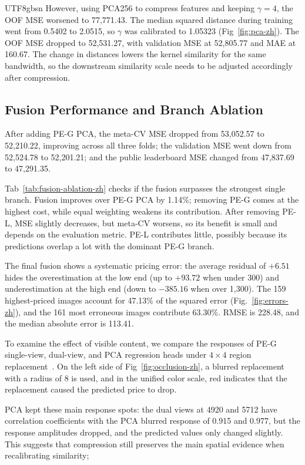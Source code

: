 \documentclass[conference,a4paper]{IEEEtran}
\begin{document}
\begin{CJK*}{UTF8}{gbsn}
However, using PCA256 to compress features and keeping $\gamma=4$, the OOF MSE worsened to 77,771.43. The median squared distance during training went from 0.5402 to 2.0515, so $\gamma$ was calibrated to 1.05323 (Fig~\ref{fig:pca-zh}). The OOF MSE dropped to 52,531.27, with validation MSE at 52,805.77 and MAE at 160.67. The change in distances lowers the kernel similarity for the same bandwidth, so the downstream similarity scale needs to be adjusted accordingly after compression.



\subsection{Fusion Performance and Branch Ablation}
After adding PE-G PCA, the meta-CV MSE dropped from 53,052.57 to 52,210.22, improving across all three folds; the validation MSE went down from 52,524.78 to 52,201.21; and the public leaderboard MSE changed from 47,837.69 to 47,291.35.

Tab~\ref{tab:fusion-ablation-zh} checks if the fusion surpasses the strongest single branch. Fusion improves over PE-G PCA by 1.14\%; removing PE-G comes at the highest cost, while equal weighting weakens its contribution. After removing PE-L, MSE slightly decreases, but meta-CV worsens, so its benefit is small and depends on the evaluation metric. PE-L contributes little, possibly because its predictions overlap a lot with the dominant PE-G branch.

The final fusion shows a systematic pricing error: the average residual of $+6.51$ hides the overestimation at the low end (up to $+93.72$ when under 300) and underestimation at the high end (down to $-385.16$ when over 1,300). The 159 highest-priced images account for 47.13\% of the squared error (Fig.~\ref{fig:errors-zh}), and the 161 most erroneous images contribute 63.30\%. RMSE is 228.48, and the median absolute error is 113.41.

To examine the effect of visible content, we compare the responses of PE-G single-view, dual-view, and PCA regression heads under $4\times4$ region replacement~\cite{occlusion}. On the left side of Fig~\ref{fig:occlusion-zh}, a blurred replacement with a radius of 8 is used, and in the unified color scale, red indicates that the replacement caused the predicted price to drop.

PCA kept these main response spots: the dual views at 4920 and 5712 have correlation coefficients with the PCA blurred response of 0.915 and 0.977, but the response amplitudes dropped, and the predicted values only changed slightly. This suggests that compression still preserves the main spatial evidence when recalibrating similarity; 


\end{CJK*}
\end{document}
